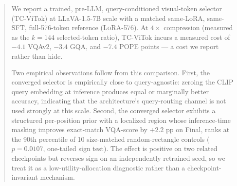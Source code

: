 \documentclass{article}
\begin{document}

\begin{abstract}
We report a trained, pre-LLM, query-conditioned visual-token selector
(TC-ViTok) at LLaVA-1.5-7B scale with a matched same-LoRA, same-SFT,
full-576-token reference (\textsc{LoRA-576}). At $4{\times}$ compression
(measured as the $k{=}144$ selected-token ratio), TC-ViTok incurs a measured
cost of $-4.1$ VQAv2, $-3.4$ GQA, and $-7.4$ POPE points --- a cost we report
rather than hide.

Two empirical observations follow from this comparison. First, the converged
selector is empirically close to query-agnostic: zeroing the CLIP query
embedding at inference produces equal or marginally better accuracy, indicating
that the architecture's query-routing channel is not used strongly at this
scale. Second, the converged selector exhibits a structured per-position prior
with a localized region whose inference-time masking improves exact-match
VQA-score by $+2.2$ pp on Final, ranks at the 90th percentile of 10
size-matched random-rectangle controls ($p{=}0.0107$, one-tailed sign test).
The effect is positive on two related checkpoints but reverses sign on an
independently retrained seed, so we treat it as a low-utility-allocation
diagnostic rather than a checkpoint-invariant mechanism.


\end{abstract}
\end{document}
